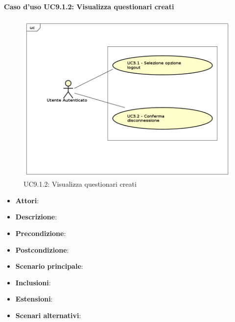 		\paragraph{Caso d'uso UC9.1.2: Visualizza questionari creati}
		\label{UC9.1.2}
		\begin{figure}[h]
			\centering
		\includegraphics[scale=0.7,keepaspectratio]{UML/UC9.png}
			\caption{UC9.1.2: Visualizza questionari creati}
		\end{figure}
		\FloatBarrier
		\begin{itemize}
			\item \textbf{Attori}: 
			\item \textbf{Descrizione}: 
			\item \textbf{Precondizione}: 
			\item \textbf{Postcondizione}: 
			\item \textbf{Scenario principale}:
			\item \textbf{Inclusioni}:
			\item \textbf{Estensioni}:
			\item \textbf{Scenari alternativi}:
		\end{itemize}
		
